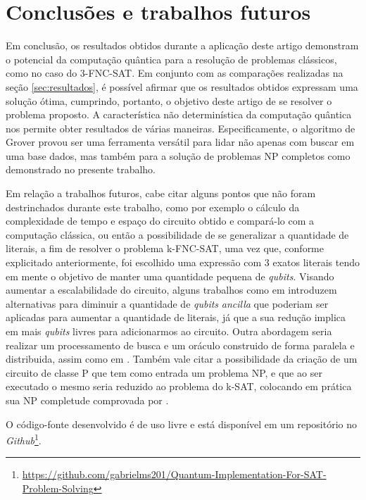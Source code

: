 \documentclass[12pt]{article}
\begin{document}
\section{Conclusões e trabalhos futuros}\label{sec:conclusoes}


Em conclusão, os resultados obtidos durante a aplicação deste artigo demonstram o potencial da computação quântica para a resolução de problemas clássicos, como no caso do 3-FNC-SAT. Em conjunto com as comparações realizadas na seção \ref{sec:resultados}, é possível afirmar que os resultados obtidos expressam uma solução ótima, cumprindo, portanto, o objetivo deste artigo de se resolver o problema proposto. 
A característica não determinística da computação quântica nos permite obter resultados de várias maneiras. Especificamente, o algoritmo de Grover provou ser uma ferramenta versátil para lidar não apenas com buscar em uma base dados, mas também para a solução de problemas NP completos como demonstrado no presente trabalho.

Em relação a trabalhos futuros, cabe citar alguns pontos que não foram destrinchados durante este trabalho, como por exemplo o cálculo da complexidade de tempo e espaço do circuito obtido e compará-lo com a computação clássica, ou então a possibilidade de se generalizar a quantidade de literais, a fim de resolver o problema k-FNC-SAT, uma vez que, conforme explicitado anteriormente, foi escolhido uma expressão com 3 exatos literais tendo em mente o objetivo de manter uma quantidade pequena de \textit{qubits}. 
Visando aumentar a escalabilidade do circuito, alguns trabalhos como em \cite{yang:23} introduzem alternativas para diminuir a quantidade de \textit{qubits} \textit{ancilla} que poderiam ser aplicadas para aumentar a quantidade de literais, já que a sua redução implica em mais \textit{qubits} livres para adicionarmos ao circuito. Outra abordagem seria realizar um processamento de busca e um oráculo construido de forma paralela e distribuida, assim como em \cite{parallelAndDistributed}. Também vale citar a possibilidade da criação de um circuito de classe P que tem como entrada um problema NP, e que ao ser executado o mesmo seria reduzido ao problema do k-SAT, colocando em prática sua NP completude comprovada por \cite{cook:71}. 

O código-fonte desenvolvido é de uso livre e está disponível em um repositório no \textit{Github}\footnote{
\url{https://github.com/gabrielms201/Quantum-Implementation-For-SAT-Problem-Solving}}.



\end{document}

